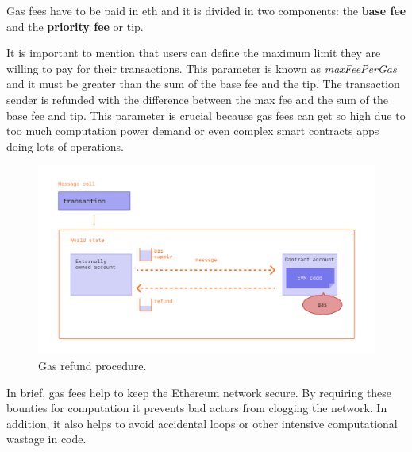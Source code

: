 {Gas fees have to be paid in \acrshort{eth} and it is divided in two components: the \textbf{base fee} and the \textbf{priority fee} or \gls{tip}.


It is important to mention that users can define the maximum limit they are willing to pay for their transactions. This parameter is known as \textit{maxFeePerGas} and it must be greater than the sum of the base fee and the tip. The transaction sender is refunded with the difference between the max fee and the sum of the base fee and tip. This parameter is crucial because gas fees can get so high due to too much computation power demand or even complex smart contracts apps doing lots of operations.
}
\begin{figure}[H]
\centering
\includegraphics[width=12cm]{img/ethereum/gas-tx.png}
\caption[Gas refund procedure]{\footnotesize{Gas refund procedure.}}
\label{fig:gas-tx}
\end{figure}

{In brief, gas fees help to keep the Ethereum network secure. By requiring these bounties for computation it prevents bad actors from clogging the network. In addition, it also helps to avoid accidental loops or other intensive computational wastage in code.}



